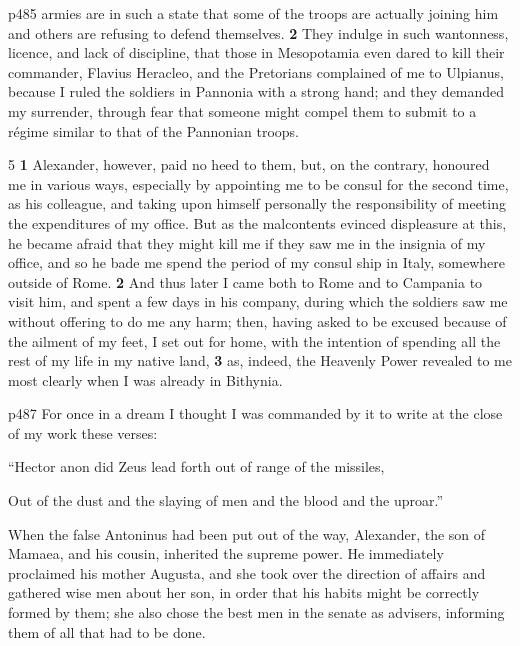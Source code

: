p485 armies are in such a state that some of the troops are actually joining him and others are refusing to defend themselves. \textbf{2} They indulge in such wantonness, licence, and lack of discipline, that those in Mesopotamia even dared to kill their commander, Flavius Heracleo, and the Pretorians complained of me to Ulpianus, because I ruled the soldiers in Pannonia with a strong hand; and they demanded my surrender, through fear that someone might compel them to submit to a régime similar to that of the Pannonian troops.

5 \textbf{1} Alexander, however, paid no heed to them, but, on the contrary, honoured me in various ways, especially by appointing me to be consul for the second time, as his colleague, and taking upon himself personally the responsibility of meeting the expenditures of my office. But as the malcontents evinced displeasure at this, he became afraid that they might kill me if they saw me in the insignia of my office, and so he bade me spend the period of my consul ­ship in Italy, somewhere outside of Rome. \textbf{2} And thus later I came both to Rome and to Campania to visit him, and spent a few days in his company, during which the soldiers saw me without offering to do me any harm; then, having asked to be excused because of the ailment of my feet, I set out for home, with the intention of spending all the rest of my life in my native land, \textbf{3} as, indeed, the Heavenly Power revealed to me most clearly when I was already in Bithynia.

p487 For once in a dream I thought I was commanded by it to write at the close of my work these verses:

``Hector anon did Zeus lead forth out of range of the missiles,

Out of the dust and the slaying of men and the blood and the uproar.''


When the false Antoninus had been put out of the way, Alexander, the son of Mamaea, and his cousin, inherited the supreme power. He immediately proclaimed his mother Augusta, and she took over the direction of affairs and gathered wise men about her son, in order that his habits might be correctly formed by them; she also chose the best men in the senate as advisers, informing them of all that had to be done.
